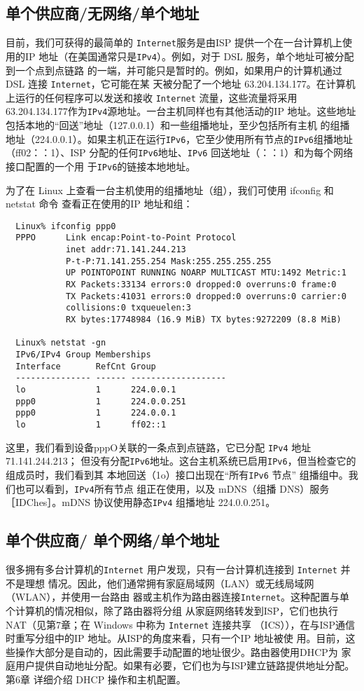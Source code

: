 \subsection{单个供应商/无网络/单个地址}
目前，我们可获得的最简单的 \verb|Internet|服务是由ISP 提供一个在一台计算机上使用的IP
地址（在美国通常只是\verb|IPv4|）。例如，对于 DSL 服务，单个地址可被分配到一个点到点链路
的一端，并可能只是暂时的。例如，如果用户的计算机通过DSL 连接 \verb|Internet|，它可能在某
天被分配了一个地址 63.204.134.177。在计算机上运行的任何程序可以发送和接收 \verb|Internet|
流量，这些流量将采用63.204.134.177作为\verb|IPv4|源地址。一台主机同样也有其他活动的IP
地址。这些地址包括本地的“回送”地址（127.0.0.1）和一些组播地址，至少包括所有主机
的组播地址（224.0.0.1）。如果主机正在运行\verb|IPv6|，它至少使用所有节点的\verb|IPv6|组播地址
（ff02：：1）、ISP 分配的任何\verb|IPv6|地址、\verb|IPv6| 回送地址（：：1）和为每个网络接口配置的一个用
于\verb|IPv6|的链接本地地址。

为了在 Linux 上查看一台主机使用的组播地址（组），我们可使用 ifconfig 和 netstat 命令
查看正在使用的IP 地址和组：

\begin{verbatim}
  Linux% ifconfig ppp0
  PPPO      Link encap:Point-to-Point Protocol
            inet addr:71.141.244.213
            P-t-P:71.141.255.254 Mask:255.255.255.255
            UP POINTOPOINT RUNNING NOARP MULTICAST MTU:1492 Metric:1
            RX Packets:33134 errors:0 dropped:0 overruns:0 frame:0
            TX Packets:41031 errors:0 dropped:0 overruns:0 carrier:0
            collisions:0 txqueuelen:3
            RX bytes:17748984 (16.9 MiB) TX bytes:9272209 (8.8 MiB)

  Linux% netstat -gn
  IPv6/IPv4 Group Memberships
  Interface       RefCnt Group
  --------------- ------ -------------------
  lo              1      224.0.0.1
  ppp0            1      224.0.0.251
  ppp0            1      224.0.0.1
  lo              1      ff02::1
\end{verbatim}

这里，我们看到设备pppO关联的一条点到点链路，它已分配 \verb|IPv4| 地址 71.141.244.213；
但没有分配\verb|IPv6|地址。这台主机系统已启用\verb|IPv6|，但当检查它的组成员时，我们看到其
本地回送（1o）接口出现在“所有\verb|IPv6| 节点” 组播组中。我们也可以看到，\verb|IPv4|所有节点
组正在使用，以及 mDNS（组播 DNS）服务［IDChes］。mDNS 协议使用静态\verb|IPv4| 组播地址
224.0.0.251。

\subsection{单个供应商/ 单个网络/单个地址}
很多拥有多台计算机的\verb|Internet| 用户发现，只有一台计算机连接到 \verb|Internet| 并不是理想
情况。因此，他们通常拥有家庭局域网（LAN）或无线局域网（WLAN），并使用一台路由
器或主机作为路由器连接\verb|Internet|。这种配置与单个计算机的情况相似，除了路由器将分组
从家庭网络转发到ISP，它们也执行 NAT（见第7章；在 Windows 中称为 \verb|Internet| 连接共享
（ICS）），在与ISP通信时重写分组中的IP 地址。从ISP的角度来看，只有一个IP 地址被使
用。目前，这些操作大部分是自动的，因此需要手动配置的地址很少。路由器使用DHCP为
家庭用户提供自动地址分配。如果有必要，它们也为与ISP建立链路提供地址分配。第6章
详细介绍 DHCP 操作和主机配置。


